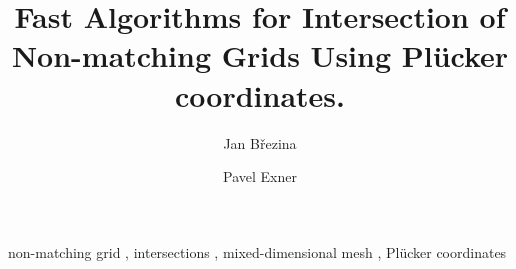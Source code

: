 \documentclass{elsarticle}
\newcommand{\plucker}{Pl\"{u}cker }
\begin{document}
\begin{frontmatter}



\title{Fast Algorithms for Intersection of Non-matching Grids Using \plucker coordinates.}



\author[adr]{Jan B{\v r}ezina}

\author[adr]{Pavel Exner}

\address[adr]{Technical University of Liberec, Studentsk{\' a} 1402/2, 461 17 Liberec 1, Czech Republic}


\begin{abstract}
\end{abstract}

\begin{keyword}
non-matching grid \sep 
intersections \sep
mixed-dimensional mesh \sep
\plucker coordinates




\end{keyword}

\end{frontmatter}
\end{document}

